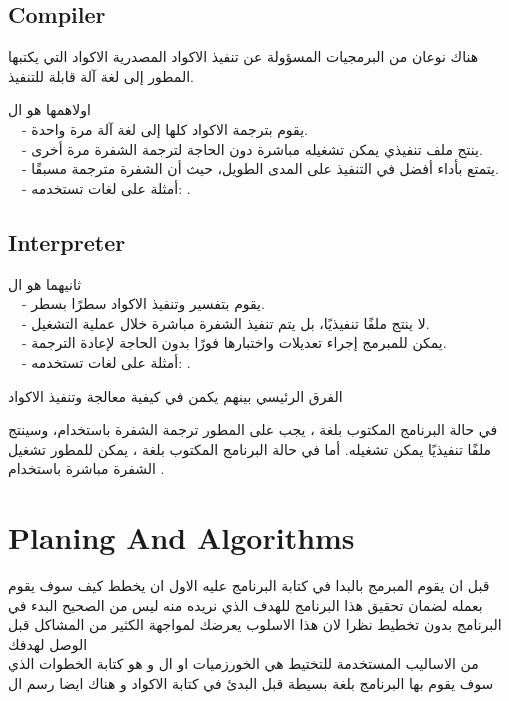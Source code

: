   \subsection{Compiler}
  \begin{AR}
    هناك نوعان من البرمجيات المسؤولة عن تنفيذ الاكواد المصدرية  \LR{)}الاكواد التي يكتبها المطور\LR{(} إلى لغة آلة قابلة للتنفيذ.
    
    اولاهمها هو ال
  \\
  \ \ - يقوم بترجمة الاكواد كلها إلى لغة آلة مرة واحدة.\\
  \ \ - ينتج ملف تنفيذي  يمكن تشغيله مباشرة دون الحاجة لترجمة الشفرة مرة أخرى.\\
  \ \ - يتمتع بأداء أفضل في التنفيذ على المدى الطويل، حيث أن الشفرة مترجمة مسبقًا.\\
  \ \ - أمثلة على لغات تستخدمه: .\\
  \end{AR}
  \subsection{Interpreter}
  \begin{AR}
  ثانيهما هو ال 
  \\
  \ \ - يقوم بتفسير وتنفيذ الاكواد سطرًا بسطر.\\
  \ \ - لا ينتج ملفًا تنفيذيًا، بل يتم تنفيذ الشفرة مباشرة خلال عملية التشغيل.\\
  \ \ - يمكن للمبرمج إجراء تعديلات واختبارها فورًا بدون الحاجة لإعادة الترجمة.\\
  \ \ - أمثلة على لغات تستخدمه: .
  
    الفرق الرئيسي بينهم يكمن في كيفية معالجة وتنفيذ الاكواد   

    في حالة البرنامج المكتوب بلغة ، يجب على المطور ترجمة الشفرة باستخدام، وسينتج ملفًا تنفيذيًا يمكن تشغيله. أما في حالة البرنامج المكتوب بلغة ، يمكن للمطور تشغيل الشفرة مباشرة باستخدام .
  \end{AR}
  
  \section{Planing And Algorithms}

  \begin{AR}
    قبل ان يقوم المبرمج بالبدا في كتابة البرنامج عليه الاول ان يخطط كيف سوف يقوم بعمله 
    لضمان تحقيق هذا البرنامج للهدف الذي نريده منه 
    ليس من الصحيح البدء في البرنامج بدون تخطيط نظرا لان هذا الاسلوب يعرضك لمواجهة الكثير من المشاكل 
    قبل الوصل لهدفك
    \\
    من الاساليب المستخدمة للتختيط هي الخورزميات او ال  و هو كتابة الخطوات الذي سوف يقوم بها البرنامج بلغة بسيطة قبل البدئ في كتابة الاكواد و هناك ايضا رسم ال
  \end{AR}
